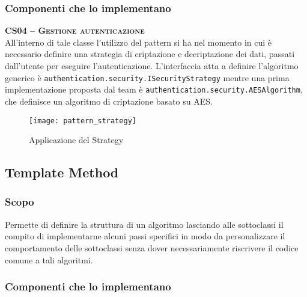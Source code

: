 \subsubsection{Componenti che lo implementano}
\begin{description}

  \item{\scshape\bfseries CS04 -- Gestione autenticazione}\\
All'interno di tale classe l'utilizzo del pattern si ha nel momento in cui è necessario definire una strategia di criptazione e decriptazione dei dati, passati dall'utente per eseguire l'autenticazione. L'interfaccia atta a definire l'algoritmo generico è \texttt{authentication.security.ISecurityStrategy} mentre una prima implementazione proposta dal team è \texttt{authentication.security.AESAlgorithm}, che definisce un algoritmo di criptazione basato su AES.

\begin{figure}[H]
  \centering
  \texttt{[image: pattern\_strategy]}
  \caption{Applicazione del  Strategy}\label{fig:strategy}
\end{figure}

\end{description}

\subsection{Template Method}
\subsubsection{Scopo}
Permette di definire la struttura di un algoritmo lasciando alle sottoclassi il compito di implementarne alcuni passi specifici in modo da personalizzare il comportamento delle sottoclassi senza dover necessariamente riscrivere il codice comune a tali algoritmi.

\subsubsection{Componenti che lo implementano}

